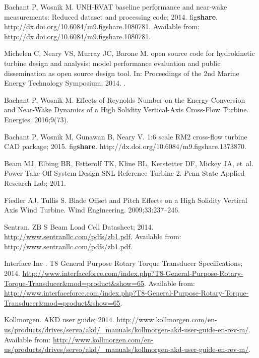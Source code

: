 \documentclass[10pt,letterpaper]{article}
\begin{document}
\begin{thebibliography}{10}
    Bachant P, Wosnik M. {UNH-RVAT} baseline performance and near-wake
    measurements: Reduced dataset and processing code; 2014.
    \newblock fig\textbf{share}. http://dx.doi.org/10.6084/m9.figshare.1080781.
    \newblock Available from: \url{http://dx.doi.org/10.6084/m9.figshare.1080781}.

    Michelen C, Neary VS, Murray JC, Barone M.
     open source code for hydrokinetic turbine design and
    analysis: model performance evaluation and public dissemination as open
    source design tool.
    \newblock In: Proceedings of the 2nd Marine Energy Technology Symposium; 2014.
    .

    Bachant P, Wosnik M.
    \newblock Effects of Reynolds Number on the Energy Conversion and Near-Wake
    Dynamics of a High Solidity Vertical-Axis Cross-Flow Turbine.
    \newblock Energies. 2016;9(73).

    Bachant P, Wosnik M, Gunawan B, Neary V. 1:6 scale {RM2} cross-flow turbine
    {CAD} package; 2015.
    \newblock fig\textbf{share}. http://dx.doi.org/10.6084/m9.figshare.1373870.

    Beam MJ, Elbing BR, Fetterolf TK, Kline BL, Kerstetter DF, Mickey JA, et~al.
    \newblock Power Take-Off System Design {SNL} Reference Turbine 2.
    \newblock Penn State Applied Research Lab; 2011.

    Fiedler AJ, Tullis S.
    \newblock Blade Offset and Pitch Effects on a High Solidity Vertical Axis Wind
    Turbine.
    \newblock Wind Engineering. 2009;33:237--246.

    Sentran. {ZB} {S} Beam Load Cell Datasheet; 2014.
    \newblock \url{http://www.sentranllc.com/pdfs/zb1.pdf}.
    \newblock Available from: \url{http://www.sentranllc.com/pdfs/zb1.pdf}.

    {Interface Inc }. T8 General Purpose Rotary Torque Transducer Specifications;
    2014.
    \newblock
    \url{http://www.interfaceforce.com/index.php?T8-General-Purpose-Rotary-Torque-Transducer&mod=product&show=65}.
    \newblock Available from:
    \url{http://www.interfaceforce.com/index.php?T8-General-Purpose-Rotary-Torque-Transducer&mod=product&show=65}.

    Kollmorgen. {AKD} user guide; 2014.
    \newblock
    \url{http://www.kollmorgen.com/en-us/products/drives/servo/akd/_manuals/kollmorgen-akd-user-guide-en-rev-m/}.
    \newblock Available from:
    \url{http://www.kollmorgen.com/en-us/products/drives/servo/akd/_manuals/kollmorgen-akd-user-guide-en-rev-m/}.


\end{thebibliography}
\end{document}
